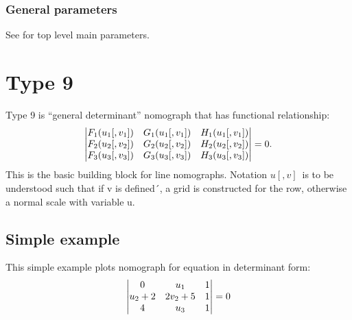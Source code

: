 \documentclass[a4paper,11pt,english]{sphinxmanual}
\begin{document}
\subsubsection{General parameters}
\label{types/types:id59}
See {\hyperref[main_params:id1]{\emph{}}} for top level main parameters.


\section{Type 9}
\label{types/types:type9-ref}\label{types/types:type-9}
Type 9 is ``general determinant'' nomograph that has functional
relationship:
\begin{gather}
\begin{split}\begin{vmatrix}
F_1(u_1[,v_1])      & G_1(u_1[,v_1]) & H_1(u_1[,v_1])      \\
F_2(u_2[,v_2])      & G_2(u_2[,v_2]) & H_2(u_2[,v_2]) \\
F_3(u_3[,v_3])      & G_3(u_3[,v_3]) & H_3(u_3[,v_3])
\end{vmatrix} = 0.\end{split}\notag
\end{gather}
This is the basic building block for line nomographs. Notation
\(u[,v]\,\) is to be understood such that if v is defined´, a grid
is constructed for the row, otherwise a normal scale with variable u.


\subsection{Simple example}
\label{types/types:id60}
This simple example plots nomograph for equation in determinant form:
\begin{gather}
\begin{split}\begin{vmatrix}
0      & u_1 & 1      \\
u_2+2      & 2v_2+5 & 1 \\
4      & u_3 & 1 \end{vmatrix} = 0\end{split}\notag
\end{gather}
\end{document}
